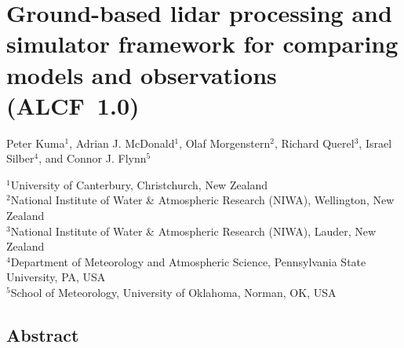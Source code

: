 \chapter{Ground-based lidar processing and simulator framework for comparing models and observations (ALCF~1.0)}

\vspace{-0.1cm}
\sffamily
\raggedright
\linespread{1.5}
Peter Kuma$^1$, Adrian J. McDonald$^1$, Olaf Morgenstern$^2$, Richard Querel$^3$, Israel Silber$^4$, and Connor J. Flynn$^5$
\footnotesize

\vspace{0.4cm}
\noindent
$^1$University of Canterbury, Christchurch, New Zealand\\
$^2$National Institute of Water \& Atmospheric Research (NIWA), Wellington, New Zealand\\
$^3$National Institute of Water \& Atmospheric Research (NIWA), Lauder, New Zealand\\
$^4$Department of Meteorology and Atmospheric Science, Pennsylvania State University, PA, USA\\
$^5$School of Meteorology, University of Oklahoma, Norman, OK, USA

\normalsize
\normalfont
\justify

\section*{Abstract}

